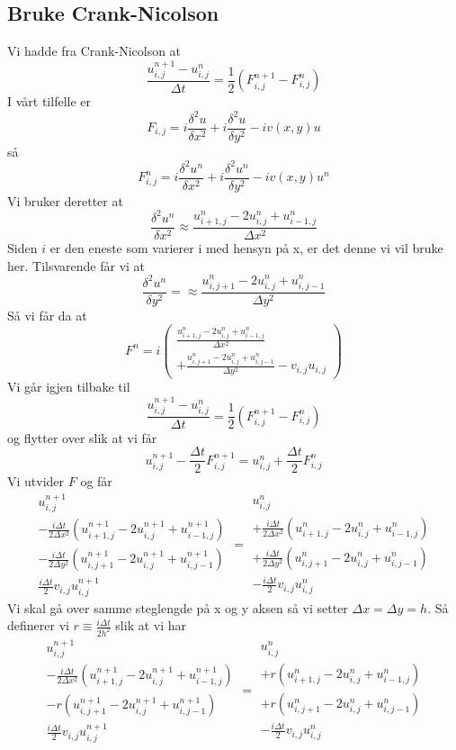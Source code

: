 \documentclass[reprint,english,notitlepage]{revtex4-2}  %
\begin{document}
\subsection{Bruke Crank-Nicolson}
Vi hadde fra Crank-Nicolson at
$$
\frac{u^{n+1}_{i,j}-u^n_{i,j}}{\Delta t}=\frac{1}{2}(F^{n+1}_{i,j}-F^{n}_{i,j})
$$
I vårt tilfelle er 
$$
F_{i,j}=i\frac{\delta^2 u}{\delta x^2}+i\frac{\delta^2 u}{\delta y^2}-iv(x,y)u
$$
så 
$$
F^{n}_{i,j}=i\frac{\delta^2 u^n}{\delta x^2}+i\frac{\delta^2 u^n}{\delta y^2}-iv(x,y)u^n
$$
Vi bruker deretter at
$$
\frac{\delta^2 u^n}{\delta x^2}\approx\frac{u^{n}_{i+1,j}-2u^{n}_{i,j}+u^n_{i-1,j}}{\Delta x^2}
$$
Siden $i$ er den eneste som varierer i med hensyn på x, er det denne vi vil bruke her. Tilsvarende får vi at
$$
\frac{\delta^2 u^n}{\delta y^2}=\approx \frac{u^n_{i,j+1}-2u^n_{i,j}+u^{n}_{i,j-1}}{\Delta y^2}
$$
Så vi får da at
$$
F^n=i\begin{pmatrix}
\frac{u^{n}_{i+1,j}-2u^{n}_{i,j}+u^n_{i-1,j}}{\Delta x^2} \\ +\frac{u^n_{i,j+1}-2u^n_{i,j}+u^{n}_{i,j-1}}{\Delta y^2}-v_{i,j}u_{i,j}
\end{pmatrix}
$$
Vi går igjen tilbake til
$$
\frac{u^{n+1}_{i,j}-u^n_{i,j}}{\Delta t}=\frac{1}{2}(F^{n+1}_{i,j}-F^{n}_{i,j})
$$
og flytter over slik at vi får
$$
u^{n+1}_{i,j}-\frac{\Delta t}{2}F^{n+1}_{i,j}=u^{n}_{i,j}+\frac{\Delta t}{2}F^{n}_{i,j}
$$
Vi utvider $F$ og får
$$
\begin{matrix}
	u_{i,j}^{n+1} \\ -\frac{i\Delta t}{2\Delta x^2}(u^{n+1}_{i+1,j}-2u^{n+1}_{i,j}+u^{n+1}_{i-1,j}) \\ -\frac{i\Delta t}{2\Delta y^2}(u^{n+1}_{i,j+1}-2u^{n+1}_{i,j}+u^{n+1}_{i,j-1}) \\ \frac{i\Delta t}{2}v_{i,j}u^{n+1}_{i,j}
\end{matrix}=\begin{matrix}
u^n_{i,j}\\ +\frac{i\Delta t}{2\Delta x^2}(u^{n}_{i+1,j}-2u^{n}_{i,j}+u^{n}_{i-1,j}) \\ +\frac{i\Delta t}{2\Delta y^2}(u^n_{i,j+1}-2u^n_{i,j}+u^{n}_{i,j-1}) \\ -\frac{i\Delta t}{2}v_{i,j}u^n_{i,j} 
\end{matrix}
$$
Vi skal gå over samme steglengde på x og y aksen så vi setter $\Delta x=\Delta y=h$. Så definerer vi $r\equiv \frac{i\Delta t}{2h^2}$ slik at vi har
$$
\begin{matrix}
	u_{i,j}^{n+1} \\ -\frac{i\Delta t}{2\Delta x^2}(u^{n+1}_{i+1,j}-2u^{n+1}_{i,j}+u^{n+1}_{i-1,j}) \\ -r(u^{n+1}_{i,j+1}-2u^{n+1}_{i,j}+u^{n+1}_{i,j-1}) \\ \frac{i\Delta t}{2}v_{i,j}u^{n+1}_{i,j}
\end{matrix}=\begin{matrix}
	u^n_{i,j}\\ +r(u^{n}_{i+1,j}-2u^{n}_{i,j}+u^{n}_{i-1,j}) \\ +r(u^n_{i,j+1}-2u^n_{i,j}+u^{n}_{i,j-1}) \\ -\frac{i\Delta t}{2}v_{i,j}u^n_{i,j} 
\end{matrix}
$$
\end{document}
